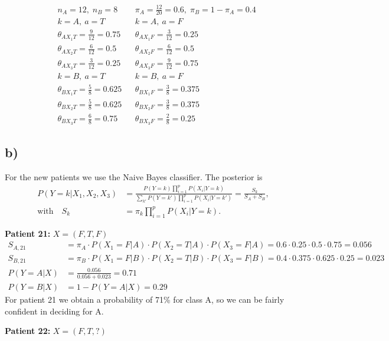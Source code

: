 \documentclass[a4paper]{scrartcl}
\begin{document}
\begin{align*}
& n_A = 12, \; n_B=8 && \pi_A= \tfrac{12}{20} = 0.6, \; \pi_B=1-\pi_A = 0.4 \\[1em]
& k=A,\ a = T && k=A,\ a = F \\
& \theta_{AX_1T} = \tfrac{9}{12} = 0.75 && \theta_{AX_1F} = \tfrac{3}{12} = 0.25 \\
& \theta_{AX_2T} = \tfrac{6}{12} = 0.5 && \theta_{AX_2F} = \tfrac{6}{12} = 0.5 \\
& \theta_{AX_3T} = \tfrac{3}{12} = 0.25 && \theta_{AX_3F} = \tfrac{9}{12} = 0.75 \\[1em]
& k=B,\ a=T && k=B,\ a=F \\
& \theta_{BX_1T} = \tfrac{5}{8} = 0.625 && \theta_{BX_1F} = \tfrac{3}{8} = 0.375 \\
& \theta_{BX_2T} = \tfrac{5}{8} = 0.625 && \theta_{BX_2F} = \tfrac{3}{8} = 0.375 \\
& \theta_{BX_3T} = \tfrac{6}{8} = 0.75 && \theta_{BX_3F} = \tfrac{2}{8} = 0.25
\end{align*}

\subsection*{b)}

For the new patients we use the Naive Bayes classifier. The posterior is
\begin{align*}
P(Y = k|X_1, X_2, X_3) &= \frac{P(Y=k)\prod_{i=1}^{p}P(X_i|Y=k)}
{\sum_{k'} P(Y=k')\prod_{i=1}^{p}P(X_i|Y=k')} = \frac{S_k}{S_A + S_B}, \\[0.5em]
\text{with}\quad S_k &= \pi_k \prod_{i=1}^{p}P(X_i|Y=k).
\end{align*}

\textbf{Patient 21:} $X=(F,T,F)$
\begin{align*}
S_{A,21} &= \pi_A \cdot P(X_1=F|A) \cdot P(X_2=T|A) \cdot P(X_3=F|A) = 0.6 \cdot 0.25 \cdot 0.5 \cdot 0.75 = 0.056 \\
S_{B,21} &= \pi_B \cdot P(X_1=F|B) \cdot P(X_2=T|B) \cdot P(X_3=F|B) = 0.4 \cdot 0.375 \cdot 0.625 \cdot 0.25 = 0.023 \\[0.5em]
P(Y=A|X) &= \frac{0.056}{0.056+0.023} = 0.71 \\
P(Y=B|X) &= 1- P(Y=A|X) = 0.29
\end{align*}
For patient 21 we obtain a probability of 71\% for class A, so we can be fairly confident in deciding for A.
\vspace{5mm}

\textbf{Patient 22:} $X=(F,T,?)$
\end{document}
